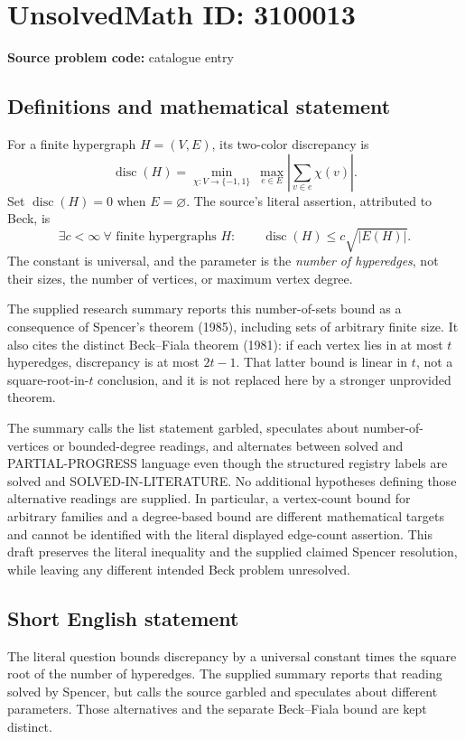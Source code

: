\documentclass[11pt]{article}
\begin{document}
\section*{UnsolvedMath ID: 3100013}
\textbf{Source problem code:} catalogue entry
\subsection{Definitions and mathematical statement}
For a finite hypergraph $H=(V,E)$, its two-color discrepancy is
\[
\operatorname{disc}(H)=
\min_{\chi:V\to\{-1,1\}}\ \max_{e\in E}
\left|\sum_{v\in e}\chi(v)\right|.
\]
Set $\operatorname{disc}(H)=0$ when $E=\varnothing$. The source's literal assertion, attributed to Beck, is
\[
\exists c<\infty\ \forall\text{ finite hypergraphs }H:\qquad
\operatorname{disc}(H)\leq c\sqrt{|E(H)|}.
\]
The constant is universal, and the parameter is the \emph{number of hyperedges}, not their sizes, the number of vertices, or maximum vertex degree.

The supplied research summary reports this number-of-sets bound as a consequence of Spencer's theorem (1985), including sets of arbitrary finite size. It also cites the distinct Beck--Fiala theorem (1981): if each vertex lies in at most $t$ hyperedges, discrepancy is at most $2t-1$. That latter bound is linear in $t$, not a square-root-in-$t$ conclusion, and it is not replaced here by a stronger unprovided theorem.

The summary calls the list statement garbled, speculates about number-of-vertices or bounded-degree readings, and alternates between solved and PARTIAL-PROGRESS language even though the structured registry labels are solved and SOLVED-IN-LITERATURE. No additional hypotheses defining those alternative readings are supplied. In particular, a vertex-count bound for arbitrary families and a degree-based bound are different mathematical targets and cannot be identified with the literal displayed edge-count assertion. This draft preserves the literal inequality and the supplied claimed Spencer resolution, while leaving any different intended Beck problem unresolved.
\subsection{Short English statement}
The literal question bounds discrepancy by a universal constant times the square root of the number of hyperedges. The supplied summary reports that reading solved by Spencer, but calls the source garbled and speculates about different parameters. Those alternatives and the separate Beck--Fiala bound are kept distinct.
\end{document}
